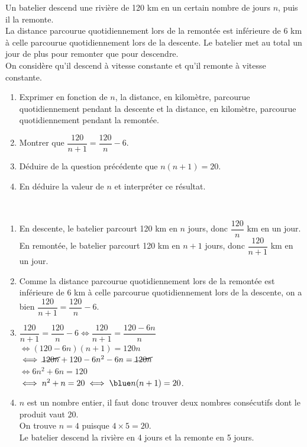 \begin{exercice}[CRPE 2017 G2] %
   Un batelier descend une rivière de 120 km en un certain nombre de jours $n$, puis il la remonte. \\
   La distance parcourue quotidiennement lors de la remontée est inférieure de 6 km à celle parcourue quotidiennement lors de la descente. Le batelier met au total un jour de plus pour remonter que pour descendre. \\
   On considère qu’il descend à vitesse constante et qu’il remonte à vitesse constante.
   \begin{enumerate}
      \item Exprimer en fonction de $n$, la distance, en kilomètre, parcourue quotidiennement pendant la descente et la distance, en kilomètre, parcourue quotidiennement pendant la remontée.
      \item Montrer que $\dfrac{120}{n+1} =\dfrac{120}{n} - 6$.
      \item Déduire de la question précédente que $n (n + 1) = 20$.
      \item En déduire la valeur de $n$ et interpréter ce résultat.
   \end{enumerate}
\end{exercice}

\begin{corrige}
\ \\ [-5mm]
   \begin{enumerate}
      \item En descente, le batelier parcourt 120 km en $n$ jours, donc {\blue $\dfrac{120}{n}$ km} en un jour. \\ [1mm]
         En remontée, le batelier parcourt 120 km en $n+1$ jours, donc {\blue $\dfrac{120}{n+1}$ km} en un jour. \\ [1mm]
      \item Comme la distance parcourue quotidiennement lors de la remontée est inférieure de 6 km à celle parcourue quotidiennement lors de la descente, on a bien {\blue $\dfrac{120}{n+1} =\dfrac{120}{n} - 6$}.
      \item $\dfrac{120}{n+1} =\dfrac{120}{n} - 6 \iff \dfrac{120}{n+1} =\dfrac{120-6n}{n}$ \\ [1mm] 
         \hspace*{2.85cm} $\iff (120-6n)(n+1) =120n$ \\
         \hspace*{2.85cm} $\iff \cancel{120n}+120-6n^2-6n =\cancel{120n}$ \\
         \hspace*{2.85cm} $\iff 6n^2+6n =120$ \\
         \hspace*{2.85cm} $\iff n^2+n =20 \iff{\blue n (n + 1) = 20}$.
      \item $n$ est un nombre entier, il faut donc trouver deux nombres consécutifs dont le produit vaut 20. \\
         On trouve $n =4$ puisque $4\times5 =20$. \\
         {\blue Le batelier descend la rivière en 4 jours et la remonte en 5 jours}.
   \end{enumerate}
\end{corrige}


